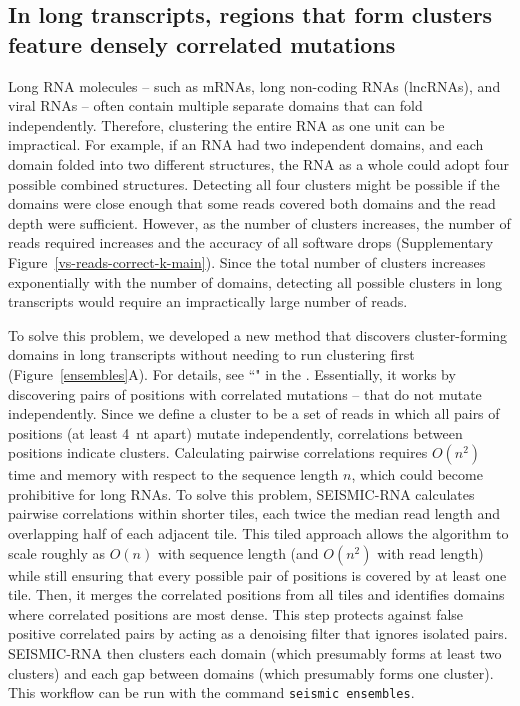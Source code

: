 \documentclass[11pt]{article}
\begin{document}
\subsection{In long transcripts, regions that form clusters feature densely correlated mutations}

Long RNA molecules -- such as mRNAs, long non-coding RNAs (lncRNAs), and viral RNAs -- often contain multiple separate domains that can fold independently.
Therefore, clustering the entire RNA as one unit can be impractical.
For example, if an RNA had two independent domains, and each domain folded into two different structures, the RNA as a whole could adopt four possible combined structures.
Detecting all four clusters might be possible if the domains were close enough that some reads covered both domains and the read depth were sufficient.
However, as the number of clusters increases, the number of reads required increases and the accuracy of all software drops (Supplementary Figure~\ref{vs-reads-correct-k-main}).
Since the total number of clusters increases exponentially with the number of domains, detecting all possible clusters in long transcripts would require an impractically large number of reads.

To solve this problem, we developed a new method that discovers cluster-forming domains in long transcripts without needing to run clustering first (Figure~\ref{ensembles}A).
For details, see ``" in the .
Essentially, it works by discovering pairs of positions with correlated mutations -- that do not mutate independently.
Since we define a cluster to be a set of reads in which all pairs of positions (at least 4~nt apart) mutate independently, correlations between positions indicate clusters.
Calculating pairwise correlations requires $O(n^2)$ time and memory with respect to the sequence length $n$, which could become prohibitive for long RNAs.
To solve this problem, SEISMIC-RNA calculates pairwise correlations within shorter tiles, each twice the median read length and overlapping half of each adjacent tile.
This tiled approach allows the algorithm to scale roughly as $O(n)$ with sequence length (and $O(n^2)$ with read length) while still ensuring that every possible pair of positions is covered by at least one tile.
Then, it merges the correlated positions from all tiles and identifies domains where correlated positions are most dense.
This step protects against false positive correlated pairs by acting as a denoising filter that ignores isolated pairs.
SEISMIC-RNA then clusters each domain (which presumably forms at least two clusters) and each gap between domains (which presumably forms one cluster).
This workflow can be run with the command \verb|seismic ensembles|.
\end{document}
